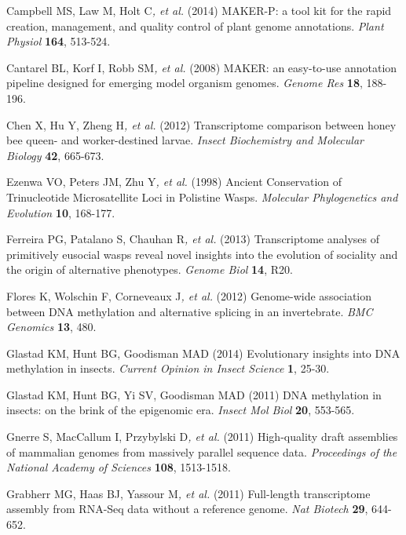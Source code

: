 \documentclass[]{article}
\begin{document}
\protect\hypertarget{ux5fENREFux5f6}{}{}Campbell MS, Law M, Holt
C\emph{, et al.} (2014) MAKER-P: a tool kit for the rapid creation,
management, and quality control of plant genome annotations. \emph{Plant
Physiol} \textbf{164}, 513-524.

\protect\hypertarget{ux5fENREFux5f7}{}{}Cantarel BL, Korf I, Robb
SM\emph{, et al.} (2008) MAKER: an easy-to-use annotation pipeline
designed for emerging model organism genomes. \emph{Genome Res}
\textbf{18}, 188-196.

\protect\hypertarget{ux5fENREFux5f8}{}{}Chen X, Hu Y, Zheng H\emph{, et
al.} (2012) Transcriptome comparison between honey bee queen- and
worker-destined larvae. \emph{Insect Biochemistry and Molecular Biology}
\textbf{42}, 665-673.

\protect\hypertarget{ux5fENREFux5f9}{}{}Ezenwa VO, Peters JM, Zhu
Y\emph{, et al.} (1998) Ancient Conservation of Trinucleotide
Microsatellite Loci in Polistine Wasps. \emph{Molecular Phylogenetics
and Evolution} \textbf{10}, 168-177.

\protect\hypertarget{ux5fENREFux5f10}{}{}Ferreira PG, Patalano S,
Chauhan R\emph{, et al.} (2013) Transcriptome analyses of primitively
eusocial wasps reveal novel insights into the evolution of sociality and
the origin of alternative phenotypes. \emph{Genome Biol} \textbf{14},
R20.

\protect\hypertarget{ux5fENREFux5f11}{}{}Flores K, Wolschin F,
Corneveaux J\emph{, et al.} (2012) Genome-wide association between DNA
methylation and alternative splicing in an invertebrate. \emph{BMC
Genomics} \textbf{13}, 480.

\protect\hypertarget{ux5fENREFux5f12}{}{}Glastad KM, Hunt BG, Goodisman
MAD (2014) Evolutionary insights into DNA methylation in insects.
\emph{Current Opinion in Insect Science} \textbf{1}, 25-30.

\protect\hypertarget{ux5fENREFux5f13}{}{}Glastad KM, Hunt BG, Yi SV,
Goodisman MAD (2011) DNA methylation in insects: on the brink of the
epigenomic era. \emph{Insect Mol Biol} \textbf{20}, 553-565.

\protect\hypertarget{ux5fENREFux5f14}{}{}Gnerre S, MacCallum I,
Przybylski D\emph{, et al.} (2011) High-quality draft assemblies of
mammalian genomes from massively parallel sequence data.
\emph{Proceedings of the National Academy of Sciences} \textbf{108},
1513-1518.

\protect\hypertarget{ux5fENREFux5f15}{}{}Grabherr MG, Haas BJ, Yassour
M\emph{, et al.} (2011) Full-length transcriptome assembly from RNA-Seq
data without a reference genome. \emph{Nat Biotech} \textbf{29},
644-652.
\end{document}
